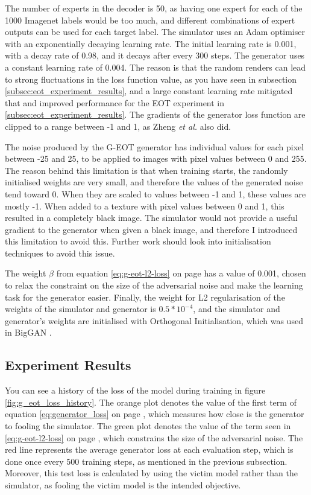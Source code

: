 The number of experts in the decoder is 50, as having one expert for each of the 1000 Imagenet labels would be too much, and different combinations of expert outputs can be used for each target label. The simulator uses an Adam optimiser with an exponentially decaying learning rate. The initial learning rate is 0.001, with a decay rate of 0.98, and it decays after every 300 steps. The generator uses a constant learning rate of 0.004. The reason is that the random renders can lead to strong fluctuations in the loss function value, as you have seen in subsection \ref{subsec:eot_experiment_results}, and a large constant learning rate mitigated that and improved performance for the EOT experiment in \ref{subsec:eot_experiment_results}. The gradients of the generator loss function are clipped to a range between -1 and 1, as Zheng \textit{et al.} \cite{zheng_black_box_GAN} also did.

The noise produced by the G-EOT generator has individual values for each pixel between -25 and 25, to be applied to images with pixel values between 0 and 255. The reason behind this limitation is that when training starts, the randomly initialised weights are very small, and therefore the values of the generated noise tend toward 0. When they are scaled to values between -1 and 1, these values are mostly -1. When added to a texture with pixel values between 0 and 1, this resulted in a completely black image. The simulator would not provide a useful gradient to the generator when given a black image, and therefore I introduced this limitation to avoid this. Further work should look into initialisation techniques to avoid this issue.

The weight $\beta$ from equation \ref{eq:g-eot-l2-loss} on page \pageref{eq:g-eot-l2-loss} has a value of 0.001, chosen to relax the constraint on the size of the adversarial noise and make the learning task for the generator easier. Finally, the weight for L2 regularisation of the weights of the simulator and generator is $0.5 * 10^{-4}$, and the simulator and generator's weights are initialised with Orthogonal Initialisation, which was used in BigGAN \cite{big_gan}.

\subsection{Experiment Results}
    \label{subsec:g_eot_experiment_results}
    
You can see a history of the loss of the model during training in figure \ref{fig:g_eot_loss_history}. The orange plot denotes the value of the first term of equation \ref{eq:generator_loss} on page \pageref{eq:generator_loss}, which measures how close is the generator to fooling the simulator. The green plot denotes the value of the term seen in \ref{eq:g-eot-l2-loss} on page \pageref{eq:g-eot-l2-loss}, which constrains the size of the adversarial noise. The red line represents the average generator loss at each evaluation step, which is done once every 500 training steps, as mentioned in the previous subsection. Moreover, this test loss is calculated by using the victim model rather than the simulator, as fooling the victim model is the intended objective.
    

